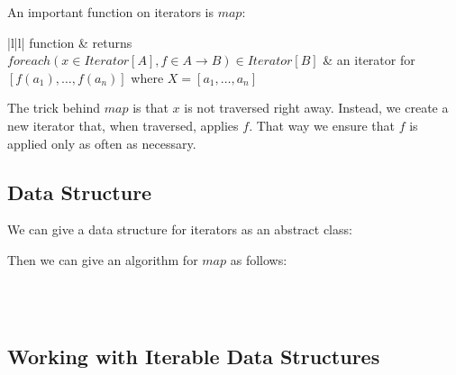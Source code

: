 An important function on iterators is $map$:
\begin{ctabular}{|l|l|}
\hline
function & returns \\
\hline
$foreach(x\in Iterator[A],f\in A\to B)\in Iterator[B]$ & an iterator for $[f(a_1),\ldots,f(a_n)]$ where $X=[a_1,\ldots,a_n]$ \\
\hline
\end{ctabular}

The trick behind $map$ is that $x$ is not traversed right away.
Instead, we create a new iterator that, when traversed, applies $f$.
That way we ensure that $f$ is applied only as often as necessary.

\subsection{Data Structure}

We can give a data structure for iterators as an abstract class:
\begin{acode}
\end{acode}

Then we can give an algorithm for $map$ as follows:
\begin{acode}
\\
\\
\end{acode}

\subsection{Working with Iterable Data Structures}\label{sec:ad:iter:use}

